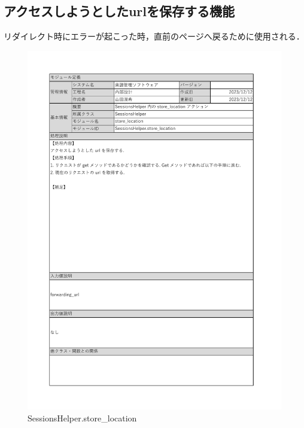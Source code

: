 \subsection*{アクセスしようとしたurlを保存する機能}
リダイレクト時にエラーが起こった時，直前のページへ戻るために使用される．
\begin{figure}[H]
    \centering
    \includegraphics[scale=0.5]{img/Helper/SessionsHelper_store_location.pdf}
    \caption{SessionsHelper.store\_location}
\end{figure}
\clearpage

